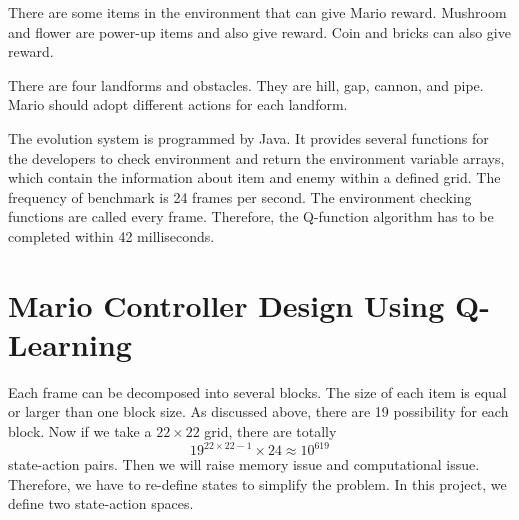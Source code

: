 There are some items in the environment that can give Mario reward. Mushroom and flower are power-up items and also give reward. Coin and bricks can also give reward.

There are four landforms and obstacles. They are hill, gap, cannon, and pipe. Mario should adopt different actions for each landform.

The evolution system is programmed by Java. It provides several functions for the developers to check environment and return the environment variable arrays, which contain the information about item  and enemy within a defined grid. The frequency of benchmark is 24 frames per second. The environment checking functions are called every frame. Therefore, the Q-function algorithm has to be completed within 42 milliseconds.

\section{Mario Controller Design Using Q-Learning}
Each frame can be decomposed into several blocks. The size of each item is equal or larger than one block size. As discussed above, there are 19 possibility for each block. Now if we take a $22\times 22$ grid, there are totally
\begin{equation}
19^{22\times 22 - 1} \times 24 \approx 10^{619}
\end{equation}
state-action pairs. Then we will raise memory issue and computational issue. Therefore, we have to re-define states to simplify the problem. In this project, we define two state-action spaces.

